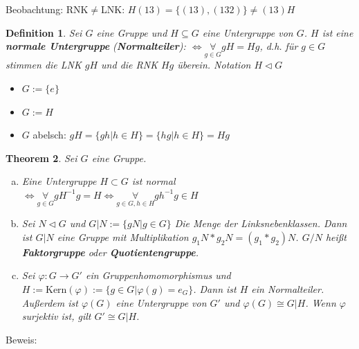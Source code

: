 \documentclass{article}
\newtheorem{thm}{Theorem}[section]
\newtheorem{defi}[thm]{Definition}
\newcommand{\Kern}{\text{Kern}}
\begin{document}
Beobachtung: RNK$\neq$LNK:
$H(13)=\{(13),(132)\}\neq (13)H$
\color{black}
\begin{defi}
    Sei $G$ eine Gruppe und $H\subseteq G$ eine
    Untergruppe von $G$. $H$ ist eine
    \textbf{normale Untergruppe} (\textbf{Normalteiler}):
    $\Leftrightarrow\underset{g\in G}\forall gH=Hg$,
    d.h. für $g\in G$ stimmen die LNK $gH$ und die RNK $Hg$
    überein.
    Notation $H\triangleleft G$
\end{defi}
\color{purple}
\begin{itemize}
    \item $G:=\{e\}$
    \item $G:=H$
    \item $G$ abelsch: $gH=\{gh|h\in H\}=\{hg|h\in H\}=Hg$
\end{itemize}
\color{black}
\begin{thm}
    Sei $G$ eine Gruppe.
    \begin{enumerate}[(a)]
        \item Eine Untergruppe $H\subset G$ ist normal
            $\Leftrightarrow \underset{g\in G}\forall
            gH^{-1}g=H\Leftrightarrow\underset{g\in G,h\in H}
            \forall gh^{-1}g\in H$
        \item
            Sei $N\triangleleft G$ und $G|N:=\{gN|g\in G\}$
            Die Menge der Linksnebenklassen. Dann ist $G|N$
            eine Gruppe mit Multiplikation $g_1N*g_2N=
            (g_1*g_2)N$. $G/N$ heißt \textbf{Faktorgruppe}
            oder \textbf{Quotientengruppe}.
        \item Sei $\varphi:G\to G'$ ein
            Gruppenhomomorphismus und $H:=\Kern(\varphi):=
            \{g\in G|\varphi(g)=e_G\}$. Dann ist $H$ ein
            Normalteiler. Außerdem ist $\varphi(G)$ eine
            Untergruppe von $G'$ und $\varphi(G)\cong G|H$.
            Wenn $\varphi$ surjektiv ist, gilt $G'\cong G|H$.
    \end{enumerate}
\end{thm}
Beweis:
\end{document}
